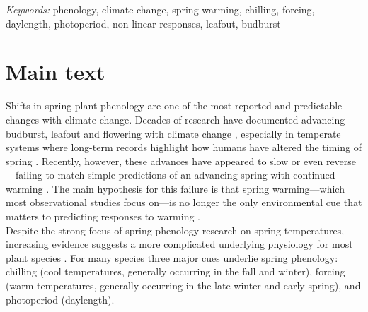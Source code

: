 \documentclass[11pt,letter]{article}
\begin{document}
\noindent \emph{Keywords:} phenology, climate change, spring warming, chilling, forcing, daylength, photoperiod, non-linear responses, leafout, budburst\\

\newpage
\linenumbers
\section{Main text} %
Shifts in spring plant phenology are one of the most reported and predictable changes with climate change. Decades of research have documented advancing budburst, leafout and flowering with climate change \citep{delpierre2009, yu2010,Ellwood2012,jochner2013,hereford2017}, especially in temperate systems where long-term records highlight how humans have altered the timing of spring \citep{Schwartz:1997nn,Menzel2003a,menzel2006}. Recently, however, these advances have appeared to slow \citep{fu2015} or even reverse \citep{yu2010}---failing to match simple predictions of an advancing spring with continued warming \citep{Ellwood2012}. The main hypothesis for this failure is that spring warming---which most observational studies focus on---is no longer the only environmental cue that matters to predicting responses to warming \citep{chuine2016,gauzere2019}.\\

Despite the strong focus of spring phenology research on spring temperatures, increasing evidence suggests a more complicated underlying physiology for most plant species \citep[e.g.,][]{zohner2016,gauzere2019,ettinger2020}. For many species three major cues underlie spring phenology: chilling (cool temperatures, generally occurring in the fall and winter), forcing (warm temperatures, generally occurring in the late winter and early spring), and photoperiod (daylength). \\
\end{document}
